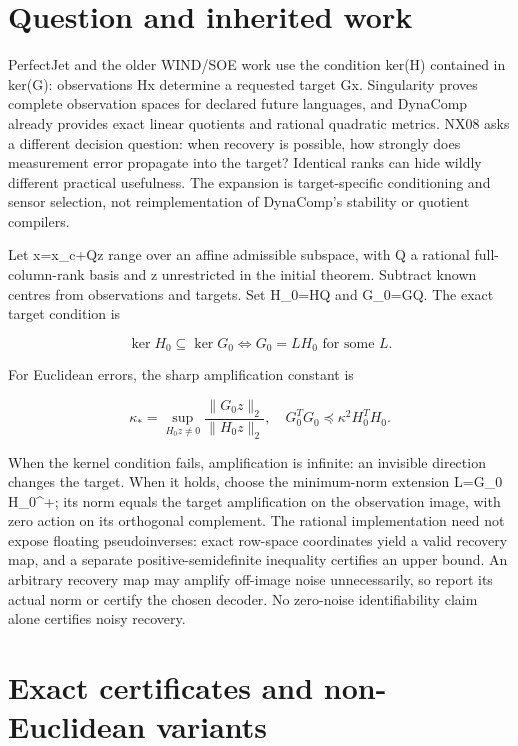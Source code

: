 \documentclass[
  11pt,
  a4paper,
]{report}
\begin{document}
\hypertarget{question-and-inherited-work}{%
\section{Question and inherited
work}\label{question-and-inherited-work}}

PerfectJet and the older WIND/SOE work use the condition ker(H)
contained in ker(G): observations Hx determine a requested target Gx.
Singularity proves complete observation spaces for declared future
languages, and DynaComp already provides exact linear quotients and
rational quadratic metrics. NX08 asks a different decision question:
when recovery is possible, how strongly does measurement error propagate
into the target? Identical ranks can hide wildly different practical
usefulness. The expansion is target-specific conditioning and sensor
selection, not reimplementation of DynaComp's stability or quotient
compilers.

Let x=x\_c+Qz range over an affine admissible subspace, with Q a
rational full-column-rank basis and z unrestricted in the initial
theorem. Subtract known centres from observations and targets. Set
H\_0=HQ and G\_0=GQ. The exact target condition is

\[
\ker H_0\subseteq\ker G_0\iff G_0=LH_0\text{ for some }L.
\]

For Euclidean errors, the sharp amplification constant is

\[
\kappa_* =\sup_{H_0z\ne0}\frac{\|G_0z\|_2}{\|H_0z\|_2},
\quad G_0^TG_0\preceq\kappa^2H_0^TH_0.
\]

When the kernel condition fails, amplification is infinite: an invisible
direction changes the target. When it holds, choose the minimum-norm
extension L=G\_0 H\_0\^{}+; its norm equals the target amplification on
the observation image, with zero action on its orthogonal complement.
The rational implementation need not expose floating pseudoinverses:
exact row-space coordinates yield a valid recovery map, and a separate
positive-semidefinite inequality certifies an upper bound. An arbitrary
recovery map may amplify off-image noise unnecessarily, so report its
actual norm or certify the chosen decoder. No zero-noise identifiability
claim alone certifies noisy recovery.

\hypertarget{exact-certificates-and-non-euclidean-variants}{%
\section{Exact certificates and non-Euclidean
variants}\label{exact-certificates-and-non-euclidean-variants}}
\end{document}
